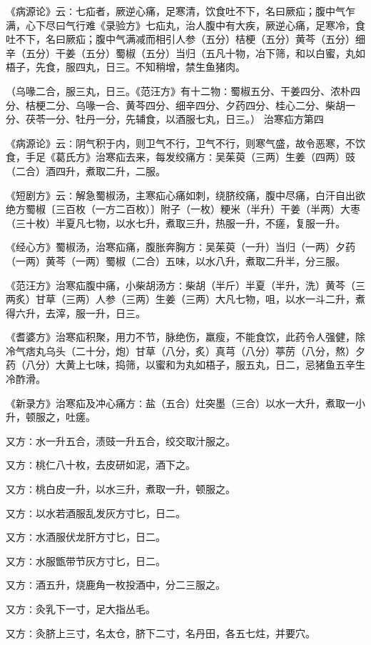 \documentclass[a4paper,12pt,UTF8,twoside]{ctexbook}
\begin{document}
《病源论》云∶七疝者，厥逆心痛，足寒清，饮食吐不下，名曰厥疝；腹中气乍满，心下尽曰气行难《录验方》七疝丸，治人腹中有大疾，厥逆心痛，足寒冷，食吐不下，名曰厥疝；腹中气满减而相引人参（五分）桔梗（五分）黄芩（五分）细辛（五分）干姜（五分）蜀椒（五分）当归（五凡十物，冶下筛，和以白蜜，丸如梧子，先食，服四丸，日三。不知稍增，禁生鱼猪肉。

（乌喙二合，服三丸，日三。《范汪方》有十二物∶蜀椒五分、干姜四分、浓朴四分、桔梗二分、乌喙一合、黄芩四分、细辛四分、夕药四分、桂心二分、柴胡一分、茯苓一分、牡丹一分，先辅食，以酒服七丸，日三。）
治寒疝方第四

《病源论》云∶阴气积于内，则卫气不行，卫气不行，则寒气盛，故令恶寒，不饮食，手足《葛氏方》治寒疝去来，每发绞痛方∶吴茱萸（三两）生姜（四两）豉（二合）酒四升，煮取二升，二服。

《短剧方》云∶解急蜀椒汤，主寒疝心痛如刺，绕脐绞痛，腹中尽痛，白汗自出欲绝方蜀椒〔三百枚（一方二百枚）〕附子（一枚）粳米（半升）干姜（半两）大枣（三十枚）半夏凡七物，以水七升，煮取三升，热服一升，不瘥，复服一升。

《经心方》蜀椒汤，治寒疝痛，腹胀奔胸方∶吴茱萸（一升）当归（一两）夕药（一两）黄芩（一两）蜀椒（二合）五味，以水八升，煮取二升半，分三服。

《范汪方》治寒疝腹中痛，小柴胡汤方∶柴胡（半斤）半夏（半升，洗）黄芩（三两炙）甘草（三两）人参（三两）生姜（三两）大凡七物，咀，以水一斗二升，煮得六升，去滓，服一升，日三。

《耆婆方》治寒疝积聚，用力不节，脉绝伤，羸瘦，不能食饮，此药令人强健，除冷气痞丸乌头（二十分，炮）甘草（八分，炙）真芎（八分）葶苈（八分，熬）夕药（八分）大黄上七味，捣筛，以蜜和为丸如梧子，服五丸，日二，忌猪鱼五辛生冷酢滑。

《新录方》治寒疝及冲心痛方∶盐（五合）灶突墨（三合）以水一大升，煮取一小升，顿服之，吐瘥。

又方∶水一升五合，渍豉一升五合，绞交取汁服之。

又方∶桃仁八十枚，去皮研如泥，酒下之。

又方∶桃白皮一升，以水三升，煮取一升，顿服之。

又方∶以水若酒服乱发灰方寸匕，日二。

又方∶水酒服伏龙肝方寸匕，日二。

又方∶水服甑带节灰方寸匕，日二。

又方∶酒五升，烧鹿角一枚投酒中，分二三服之。

又方∶灸乳下一寸，足大指丛毛。

又方∶灸脐上三寸，名太仓，脐下二寸，名丹田，各五七炷，并要穴。
\end{document}
